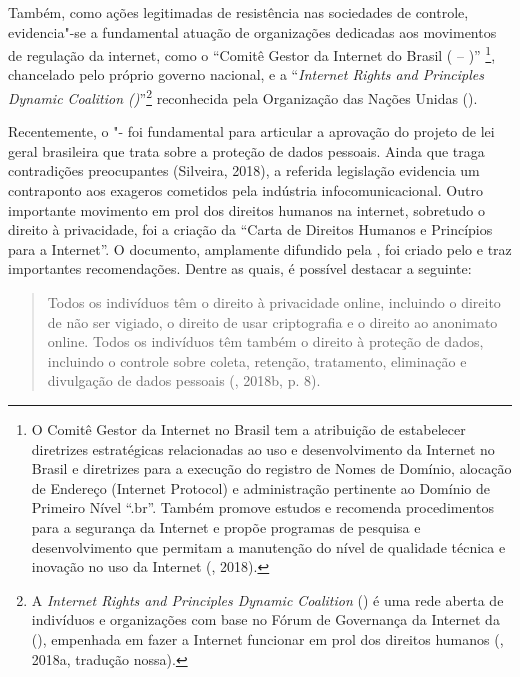 Também, como ações legitimadas de resistência nas sociedades de
controle, evidencia"-se a fundamental atuação de organizações dedicadas
aos movimentos de regulação da internet, como o ``Comitê Gestor da
Internet do Brasil ( -- )'' \footnote{O Comitê Gestor da Internet no
  Brasil tem a atribuição de estabelecer diretrizes estratégicas
  relacionadas ao uso e desenvolvimento da Internet no Brasil e
  diretrizes para a execução do registro de Nomes de Domínio, alocação
  de Endereço  (Internet Protocol) e administração pertinente ao
  Domínio de Primeiro Nível ``.br''. Também promove estudos e recomenda
  procedimentos para a segurança da Internet e propõe programas de
  pesquisa e desenvolvimento que permitam a manutenção do nível de
  qualidade técnica e inovação no uso da Internet (, 2018).},
chancelado pelo próprio governo nacional, e a ``\emph{Internet Rights
and Principles Dynamic Coalition ()}''\footnote{A \emph{Internet
  Rights and Principles Dynamic Coalition} () é uma rede aberta de
  indivíduos e organizações com base no Fórum de Governança da Internet
  da  (), empenhada em fazer a Internet funcionar em prol dos
  direitos humanos (, 2018a, tradução nossa).} reconhecida pela Organização das Nações Unidas ().

Recentemente, o "- foi fundamental para articular a aprovação do
projeto de lei geral brasileira que trata sobre a proteção de dados
pessoais. Ainda que traga contradições preocupantes (Silveira, 2018), a
referida legislação evidencia um contraponto aos exageros cometidos pela
indústria infocomunicacional. Outro importante movimento em prol dos
direitos humanos na internet, sobretudo o direito à privacidade, foi a
criação da ``Carta de Direitos Humanos e Princípios para a Internet''. O
documento, amplamente difundido pela , foi criado pelo  e traz
importantes recomendações. Dentre as quais, é possível destacar a
seguinte:

\begin{quote}
Todos os indivíduos têm o direito à privacidade online, incluindo o
direito de não ser vigiado, o direito de usar criptografia e o direito
ao anonimato online. Todos os indivíduos têm também o direito à proteção
de dados, incluindo o controle sobre coleta, retenção, tratamento,
eliminação e divulgação de dados pessoais (, 2018b, p. 8).
\end{quote}

